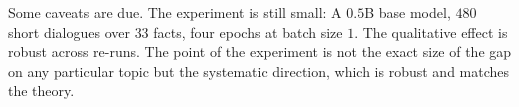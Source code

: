 \documentclass[11pt]{article}
\begin{document}
Some caveats are due. The experiment is still small: A $0.5$B base model, $480$ short
dialogues over $33$ facts, four epochs at batch size $1$. The
qualitative effect is robust across re-runs.
The point of the experiment
is not the exact size of the gap on any particular topic but the
systematic direction, which is robust and matches the theory.
















\end{document}
